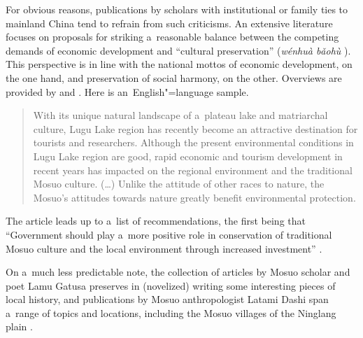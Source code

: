 For obvious reasons, publications by scholars with institutional or family ties to mainland China tend to refrain from such criticisms. An extensive literature focuses on proposals for striking a~reasonable balance between the competing demands of
economic development and “cultural preservation” 
(\textit{wénhuà bǎohù} ). This perspective is in line with the national mottos of economic development, on the one
hand, and preservation of social harmony, on the other. Overviews are provided by \citet{knodel1995} and \citet{he2008}. Here is an~{English}"=language sample.

\begin{quotation}
	With its unique natural landscape of a~plateau
	lake and matriarchal culture, Lugu Lake region has
	recently become an attractive destination for tourists
	and researchers. Although the present environmental
	conditions in Lugu Lake region are good,
	rapid economic and tourism development in
	recent years has impacted on the regional environment
	and the traditional Mosuo culture. ({\dots}) Unlike the attitude
	of other races to nature, the Mosuo’s attitudes
	towards nature greatly benefit environmental
	protection. \citep[49-51]{yanetal2008}
\end{quotation}

{\noindent}The article leads up to a~list of recommendations, the first being that “Government should play a~more positive role in conservation of traditional Mosuo culture and the local environment through increased investment” \citep[54]{yanetal2008}.

On a~much less predictable note, the \citeyear{lamu2007} collection of articles by Mosuo 
scholar and poet Lamu Gatusa  preserves in (novelized) writing some interesting pieces of local history, and publications by Mosuo anthropologist Latami Dashi  span a~range of topics and locations, including the Mosuo villages of the Ninglang plain \citep{latami2009, latami2016}. 
